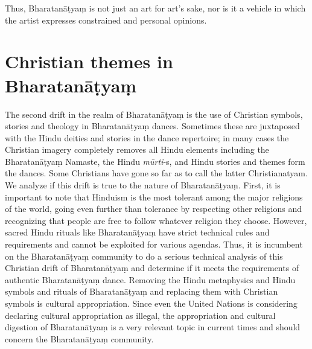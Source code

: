 \vskip -2pt

Thus, Bharatanāṭyaṃ is not just an art for art’s sake, nor is it a vehicle in which the artist expresses constrained and personal opinions.


\section*{Christian themes in Bharatanāṭyaṃ}

The second drift in the realm of Bharatanāṭyaṃ is the use of Christian symbols, stories and theology in Bharatanāṭyaṃ dances. Sometimes these are juxtaposed with the Hindu deities and stories in the dance repertoire; in many cases the Christian imagery completely removes all Hindu elements including the Bharatanāṭyaṃ Namaste, the Hindu \textit{mūrti}-s, and Hindu stories and themes form the dances. Some Christians have gone so far as to call the latter Christianatyam. We analyze if this drift is true to the nature of Bharatanāṭyaṃ. First, it is important to note that Hinduism is the most tolerant among the major religions of the world, going even further than tolerance by respecting other religions and recognizing that people are free to follow whatever religion they choose. However, sacred Hindu rituals like Bharatanāṭyaṃ have strict technical rules and requirements and cannot be exploited for various agendas. Thus, it is incumbent on the Bharatanāṭyaṃ community to do a serious technical analysis of this Christian drift of Bharatanāṭyaṃ and determine if it meets the requirements of authentic Bharatanāṭyaṃ dance. Removing the Hindu metaphysics and Hindu symbols and rituals of Bharatanāṭyaṃ and replacing them with Christian symbols is cultural appropriation. Since even the United Nations is considering declaring cultural appropriation as illegal, the appropriation and cultural digestion of Bharatanāṭyaṃ is a very relevant topic in current times and should concern the Bharatanāṭyaṃ community.

